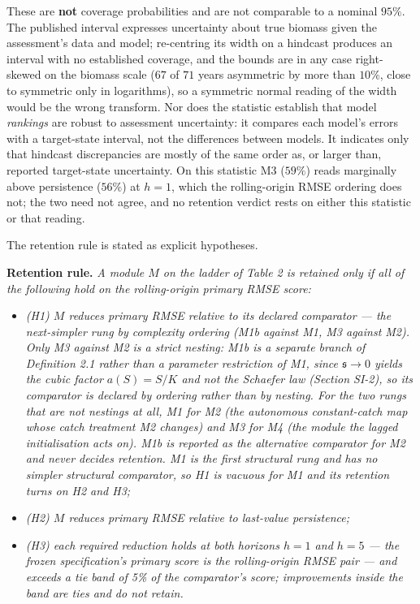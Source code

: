\documentclass[11pt]{article}
\providecommand{\tightlist}{\setlength{\itemsep}{0pt}\setlength{\parskip}{0pt}}
\begin{document}
These are \textbf{not} coverage probabilities and are not comparable to a
nominal \(95\%\). The published interval expresses uncertainty about
true biomass given the assessment's data and model; re-centring its
width on a hindcast produces an interval with no established coverage,
and the bounds are in any case right-skewed on the biomass scale
(\(67\) of \(71\) years asymmetric by more than \(10\%\), close to
symmetric only in logarithms), so a symmetric normal reading of the
width would be the wrong transform. Nor does the statistic establish
that model \emph{rankings} are robust to assessment uncertainty: it
compares each model's errors with a target-state interval, not the
differences between models. It indicates only that hindcast
discrepancies are mostly of the same order as, or larger than, reported
target-state uncertainty. On this statistic M3 (\(59\%\)) reads
marginally above persistence (\(56\%\)) at \(h=1\), which the
rolling-origin RMSE ordering does not; the two need not agree, and no
retention verdict rests on either this statistic or that reading.

The retention rule is stated as explicit hypotheses.

\textbf{Retention rule.} \emph{A module \(M\) on the ladder of Table 2
is retained only if all of the following hold on the rolling-origin
primary RMSE score:}

\begin{itemize}
\tightlist
\item
  \emph{(H1) \(M\) reduces primary RMSE relative to its declared
  comparator --- the next-simpler rung by complexity ordering (M1b against
  M1, M3 against M2). Only M3 against M2 is a strict nesting: M1b is a
  separate branch of Definition 2.1 rather than a parameter restriction
  of M1, since \(\mathfrak s \to 0\) yields the cubic factor
  \(a(S)=S/K\) and not the Schaefer law (Section SI-2), so its
  comparator is declared by ordering rather than by nesting. For the two
  rungs that are not nestings at all, M1
  for M2 (the autonomous constant-catch map whose catch treatment M2
  changes) and M3 for M4 (the module the lagged initialisation acts on). M1b is reported
  as the alternative comparator for M2 and never decides retention. M1
  is the first structural rung and has no simpler structural comparator,
  so H1 is vacuous for M1 and its retention turns on H2 and H3;}
\item
  \emph{(H2) \(M\) reduces primary RMSE relative to last-value
  persistence;}
\item
  \emph{(H3) each required reduction holds at both horizons \(h=1\) and
  \(h=5\) --- the frozen specification's primary score is the
  rolling-origin RMSE pair --- and exceeds a tie band of 5\% of the
  comparator's score; improvements inside the band are ties and do not
  retain.}
\end{itemize}
\end{document}
